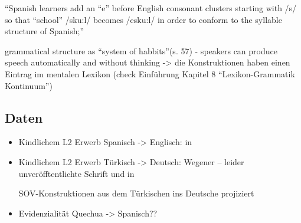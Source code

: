 ``Spanish learners add an ``e'' before English consonant clusters starting with /s/ so that ``school'' /sku:l/ becomes /esku:l/ in order to conform to the syllable structure of Spanish;''

grammatical structure as ``system of habbits''(s. 57) - speakers can produce speech automatically and without thinking -> die Konstruktionen haben einen Eintrag im mentalen Lexikon (check Einführung \cite{Ziem13} Kapitel 8 ``Lexikon-Grammatik Kontinuum'')

\subsection{Daten}
\begin{itemize}
    \item Kindlichem L2 Erwerb Spanisch -> Englisch: \cite{Wong-Fillmore76} in \cite{Haberzettl06}
    \item Kindlichem L2 Erwerb Türkisch -> Deutsch: Wegener\cite{} -- leider unveröfftentlichte Schrift
und \cite{Haberzettl05} in \cite{Haberzettl06}

SOV-Konstruktionen aus dem Türkischen ins Deutsche projiziert

    \item Evidenzialität Quechua -> Spanisch??
\end{itemize}
